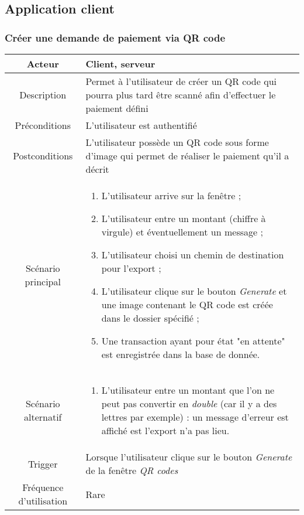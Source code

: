 \documentclass{article}
\begin{document}
\subsection{Application client}

\subsubsection{Créer une demande de paiement via QR code}

\begin{table}[h!]

\begin{tabular}{|c|p{11cm}|}
\hline
Acteur & Client, serveur \\
\hline
Description & Permet à l'utilisateur de créer un QR code qui pourra plus tard être scanné afin d'effectuer le paiement défini \\
\hline
Préconditions & L'utilisateur est authentifié \\
\hline
Postconditions & L'utilisateur possède un QR code sous forme d'image qui permet de réaliser le paiement qu'il a décrit \\
\hline
Scénario principal & \begin{enumerate}
\item L'utilisateur arrive sur la fenêtre ;
\item L'utilisateur entre un montant (chiffre à virgule) et éventuellement un message ;
\item L'utilisateur choisi un chemin de destination pour l'export ;
\item L'utilisateur clique sur le bouton \emph{Generate} et une image contenant le QR code est créée dans le dossier spécifié ;
\item Une transaction ayant pour état "en attente" est enregistrée dans la base de donnée.
\end{enumerate} \\
\hline
Scénario alternatif & \begin{enumerate}
\item L'utilisateur entre un montant que l'on ne peut pas convertir en \emph{double} (car il y a des lettres par exemple) : un message d'erreur est affiché est l'export n'a pas lieu.
\end{enumerate} \\
\hline
Trigger & Lorsque l'utilisateur clique sur le bouton \emph{Generate} de la fenêtre \emph{QR codes} \\
\hline
Fréquence d'utilisation & Rare \\
\hline
\end{tabular}

\end{table}
\end{document}
